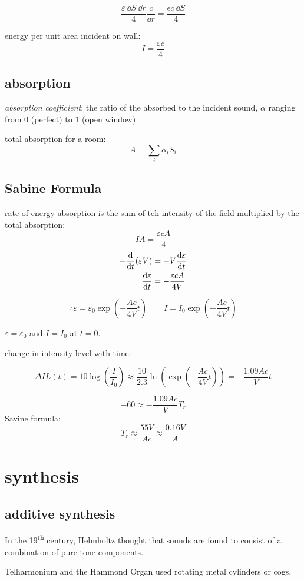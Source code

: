 \documentclass[10pt, a4paper, twocolumn]{article}
\newcommand{\deff}[1]{\par \noindent \textit{#1}: }
\newcommand{\eps}{\ensuremath{\varepsilon _0}}
\begin{document}
\[\frac{\varepsilon\ \dd S\ \dd r}{4}
\frac{c}{\dd r} = \frac{\epsilon c\ \dd S}{4}\]

energy per unit area incident on wall:
\[I=\frac{\varepsilon c}{4}\]

\subsection{absorption}
\deff{absorption coefficient}
the ratio of the absorbed to the incident sound, $\alpha$ ranging from 0 (perfect) to 1 (open window)

total absorption for a room:
\[A=\sum _i\alpha _iS_i\]

\subsection{Sabine Formula}
rate of energy absorption is the sum of teh intensity of the field multiplied by the total absorption:
\[IA = \frac{\varepsilon cA}{4}\]
\begin{equation*}
\begin{aligned}
-\dv{t}(\varepsilon V)&=-V\dv{\varepsilon}{t}
\\ \dv{\varepsilon}{t}&=-\frac{\varepsilon cA}{4V}
\end{aligned}
\end{equation*}

\[\therefore
\varepsilon = \eps \exp(-\frac{Ac}{4V}t)
\qquad I = I_0 \exp(-\frac{Ac}{4V}t)\]

$\varepsilon = \eps$ and $I=I_0$ at $t=0$.

change in intensity level with time:

\[\Delta IL(t) =10\log(\frac{I}{I_0})
\approx\frac{10}{2.3}
\ln(\exp(-\frac{Ac}{4V}t))
=-\frac{1.09Ac}{V}t\]

\[-60 \approx -\frac{1.09Ac}{V}T_r\]
Savine formula:
\[T_r \approx \frac{55V}{Ac}
\approx \frac{0.16V}{A}\]

\section{synthesis}
\subsection{additive synthesis}
In the 19\textsuperscript{th} century, Helmholtz thought that sounds are found to consist of a combination of pure tone components.

Telharmonium and the Hammond Organ used rotating metal cylinders or cogs.
\end{document}

